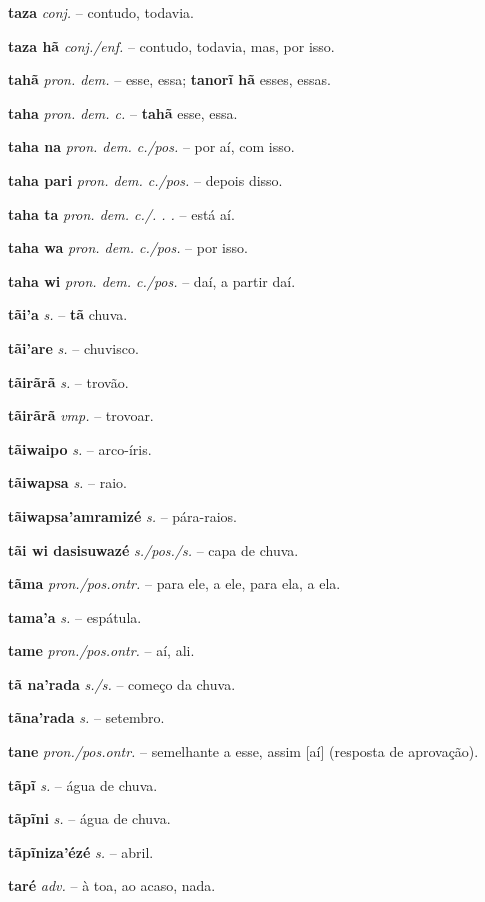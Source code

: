 \textbf{taza} \textit{conj.} -- contudo, todavia.

\textbf{taza hã} \textit{conj./enf.} -- contudo, todavia, mas, por isso.

\textbf{tahã} \textit{pron. dem.} -- esse, essa; \textbf{tanorĩ hã} esses, essas.

\textbf{taha} \textit{pron. dem. c.} -- \textbf{tahã} esse, essa.

\textbf{taha na} \textit{pron. dem. c./pos.} -- por aí, com isso.

\textbf{taha pari} \textit{pron. dem. c./pos.} -- depois disso.

\textbf{taha ta} \textit{pron. dem. c./. . .} -- está aí.

\textbf{taha wa} \textit{pron. dem. c./pos.} -- por isso.

\textbf{taha wi} \textit{pron. dem. c./pos.} -- daí, a partir daí.

\textbf{tãi'a} \textit{s.} -- \textbf{tã} chuva.

\textbf{tãi'are} \textit{s.} -- chuvisco.

\textbf{tãirãrã} \textit{s.} -- trovão.

\textbf{tãirãrã} \textit{vmp.} -- trovoar.

\textbf{tãiwaipo} \textit{s.} -- arco-íris.

\textbf{tãiwapsa} \textit{s.} -- raio.

\textbf{tãiwapsa'amramizé} \textit{s.} -- pára-raios.

\textbf{tãi wi dasisuwazé} \textit{s./pos./s.} -- capa de chuva.

\textbf{tãma} \textit{pron./pos.ontr.} -- para ele, a ele, para ela, a ela.

\textbf{tama'a} \textit{s.} -- espátula.

\textbf{tame} \textit{pron./pos.ontr.} -- aí, ali.

\textbf{tã na'rada} \textit{s./s.} -- começo da chuva.

\textbf{tãna'rada} \textit{s.} -- setembro.

\textbf{tane} \textit{pron./pos.ontr.} -- semelhante a esse, assim [aí] (resposta de aprovação).

\textbf{tãpĩ} \textit{s.} -- água de chuva.

\textbf{tãpĩni} \textit{s.} -- água de chuva.

\textbf{tãpĩniza'ézé} \textit{s.} -- abril.

\textbf{taré} \textit{adv.} -- à toa, ao acaso, nada.

